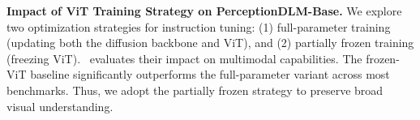 \noindent
\textbf{Impact of ViT Training Strategy on PerceptionDLM-Base.}
We explore two optimization strategies for instruction tuning: (1) full-parameter training (updating both the diffusion backbone and ViT), and (2) partially frozen training (freezing ViT).~ evaluates their impact on multimodal capabilities. The frozen-ViT baseline significantly outperforms the full-parameter variant across most benchmarks. Thus, we adopt the partially frozen strategy to preserve broad visual understanding.





